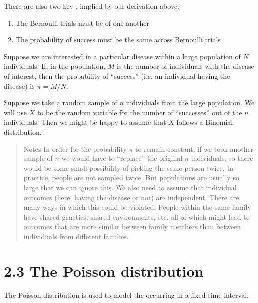 \documentclass[letterpaper,10pt,english]{jupyterBook}
\begin{document}
\sphinxAtStartPar
There are also two key , implied by our derivation above:
\begin{enumerate}
%
\item {} 
\sphinxAtStartPar
The Bernoulli trials must be  of one another

\item {} 
\sphinxAtStartPar
The probability of success must be the same across Bernoulli trials

\end{enumerate}

\sphinxAtStartPar
{}

\sphinxAtStartPar
Suppose we are interested in a particular disease within a large population of \(N\) individuals. If, in the population, \(M\) is the number of individuals with the disease of interest, then the probability of “success” (i.e. an individual having the disease) is \(\pi = M/N\).

\sphinxAtStartPar
Suppose we take a random sample of \(n\) individuals from the large population. We will use \(X\) to be the random variable for the number of “successes” out of the \(n\) individuals. Then we might be happy to assume that \(X\) follows a Binomial distribution.
\begin{quote}

\sphinxAtStartPar
Notes    \sphinxhyphen{} In order for the probability \(\pi\) to remain constant, if we took another sample of \(n\) we would have to “replace” the original \(n\) individuals, so there would be some small possibility of picking the same person twice. In practice, people are not sampled twice. But populations are usually so large that we can ignore this.   \sphinxhyphen{} We also need to assume that individual outcomes (here, having the disease or not) are independent. There are many ways in which this could be violated. People within the same family have shared genetics, shared environments, etc. all of which might lead to outcomes that are more similar between family members than between individuals from different families.
\end{quote}


\section{2.3 The Poisson distribution}
\label{\detokenize{02.d. Probability.Discrete:the-poisson-distribution}}\label{\detokenize{02.d. Probability.Discrete::doc}}
\sphinxAtStartPar
The Poisson distribution is used to model the  occurring in a fixed time interval.
\end{document}
